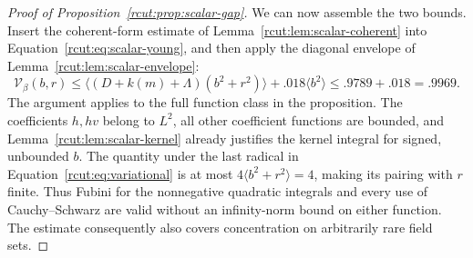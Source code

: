 \begin{proof}[Proof of Proposition~\ref{rcut:prop:scalar-gap}]
We can now assemble the two bounds. Insert the coherent-form estimate
of Lemma~\ref{rcut:lem:scalar-coherent} into
Equation~\eqref{rcut:eq:scalar-young}, and then apply the diagonal
envelope of Lemma~\ref{rcut:lem:scalar-envelope}:
\[
 \mathcal V_\beta(b,r)
 \leq\langle(D+k(m)+\Lambda{})(b^2+r^2)\rangle+.018\langle b^2\rangle
 \leq.9789+.018=.9969.
\]
The argument applies to the full function class in the proposition.
The coefficients \(h,hv\) belong to \(L^2\), all other coefficient
functions are bounded, and Lemma~\ref{rcut:lem:scalar-kernel} already
justifies the kernel integral for signed, unbounded \(b\).
The quantity under the last radical in
Equation~\eqref{rcut:eq:variational} is at most
\(4\langle b^2+r^2\rangle=4\), making its pairing with \(r\) finite.
Thus Fubini for the nonnegative quadratic integrals and every use of
Cauchy--Schwarz are valid without an infinity-norm bound on either
function. The estimate consequently also covers concentration on
arbitrarily rare field sets.
\end{proof}

